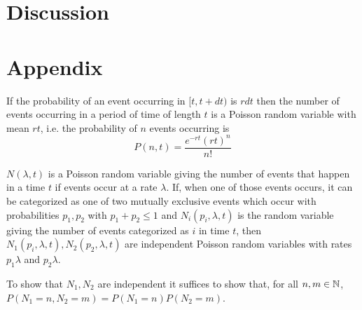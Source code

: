 \documentclass{article}
\begin{document}
\section{Discussion}

\section{Appendix}
\begin{fact}
If the probability of an event occurring in $[t,t+dt)$ is $rdt$ then the number of events occurring in a period of time of length $t$ is a Poisson random variable with mean $rt$, i.e. the probability of $n$ events occurring is 
$$P(n,t)=\frac{e^{-rt}(rt)^n}{n!}$$
\end{fact}
\begin{pf}
\end{pf}

\begin{fact}
$N(\lambda,t)$ is a Poisson random variable giving the number of events that happen in a time $t$ if events occur at a rate $\lambda$.  If, when one of those events occurs, it can be categorized as one of two mutually exclusive events which occur with probabilities $p_1,p_2$ with $p_1+p_2\leq 1$ and $N_i(p_i,\lambda,t)$ is the random variable giving the number of events categorized as $i$ in time $t$, then $N_1(p_i,\lambda,t),N_2(p_2,\lambda,t)$ are independent Poisson random variables with rates $p_1\lambda$ and $p_2\lambda$.
\end{fact}
\begin{pf}
To show that $N_1,N_2$ are independent it suffices to show that, for all $n,m\in{\mathbb{N}}$, $P(N_1=n,N_2=m)=P(N_1=n)P(N_2=m)$.
\end{pf}

\nocite{*}


\end{document}
